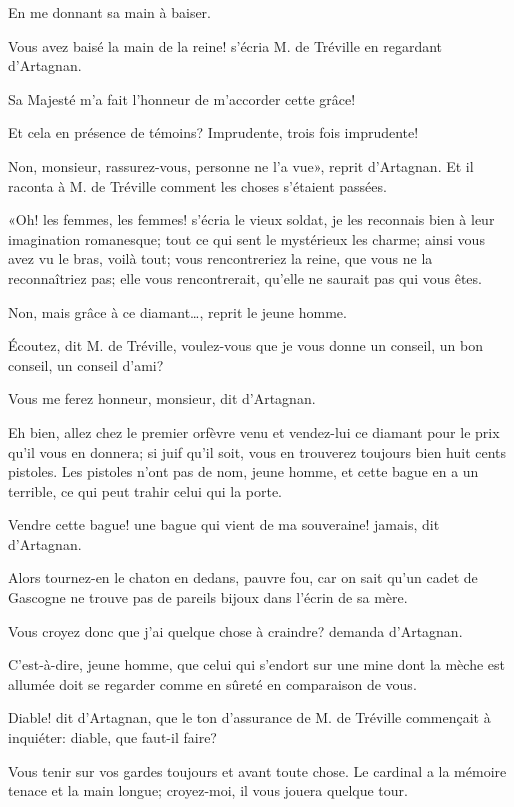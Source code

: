 \speak  En me donnant sa main à baiser. 

\speak  Vous avez baisé la main de la reine! s'écria M. de Tréville en regardant d'Artagnan. 

\speak  Sa Majesté m'a fait l'honneur de m'accorder cette grâce! 

\speak  Et cela en présence de témoins? Imprudente, trois fois imprudente! 

\speak  Non, monsieur, rassurez-vous, personne ne l'a vue», reprit d'Artagnan. Et il raconta à M. de Tréville comment les choses s'étaient passées. 

«Oh! les femmes, les femmes! s'écria le vieux soldat, je les reconnais bien à leur imagination romanesque; tout ce qui sent le mystérieux les charme; ainsi vous avez vu le bras, voilà tout; vous rencontreriez la reine, que vous ne la reconnaîtriez pas; elle vous rencontrerait, qu'elle ne saurait pas qui vous êtes. 

\speak  Non, mais grâce à ce diamant\dots, reprit le jeune homme. 

\speak  Écoutez, dit M. de Tréville, voulez-vous que je vous donne un conseil, un bon conseil, un conseil d'ami? 

\speak  Vous me ferez honneur, monsieur, dit d'Artagnan. 

\speak  Eh bien, allez chez le premier orfèvre venu et vendez-lui ce diamant pour le prix qu'il vous en donnera; si juif qu'il soit, vous en trouverez toujours bien huit cents pistoles. Les pistoles n'ont pas de nom, jeune homme, et cette bague en a un terrible, ce qui peut trahir celui qui la porte. 

\speak  Vendre cette bague! une bague qui vient de ma souveraine! jamais, dit d'Artagnan. 

\speak  Alors tournez-en le chaton en dedans, pauvre fou, car on sait qu'un cadet de Gascogne ne trouve pas de pareils bijoux dans l'écrin de sa mère. 

\speak  Vous croyez donc que j'ai quelque chose à craindre? demanda d'Artagnan. 

\speak  C'est-à-dire, jeune homme, que celui qui s'endort sur une mine dont la mèche est allumée doit se regarder comme en sûreté en comparaison de vous. 

\speak  Diable! dit d'Artagnan, que le ton d'assurance de M. de Tréville commençait à inquiéter: diable, que faut-il faire? 

\speak  Vous tenir sur vos gardes toujours et avant toute chose. Le cardinal a la mémoire tenace et la main longue; croyez-moi, il vous jouera quelque tour. 

